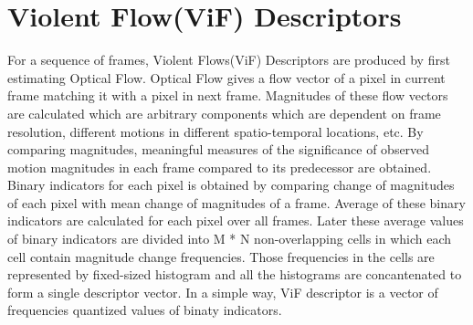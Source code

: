 \section{Violent Flow(ViF) Descriptors}
For a sequence of frames, Violent Flows(ViF) Descriptors\cite{hassner} are produced by first estimating Optical Flow. Optical Flow\cite{liu} gives a flow vector of a pixel in current frame matching it with a pixel in next frame. Magnitudes of these flow vectors are calculated which are arbitrary components which are dependent on frame resolution, different motions in different spatio-temporal locations, etc. By comparing magnitudes, meaningful measures of the significance of observed motion magnitudes in each frame compared to its predecessor are obtained. Binary indicators for each pixel is obtained by comparing change of magnitudes of each pixel with mean change of magnitudes of a frame. Average of these binary indicators are calculated for each pixel over all frames. Later these average values of binary indicators are divided into M * N non-overlapping cells in which each cell contain magnitude change frequencies. Those frequencies in the cells are represented by fixed-sized histogram and all the histograms are concantenated to form a single descriptor vector. In a simple way, ViF descriptor is a vector of frequencies quantized values of binaty indicators. 

